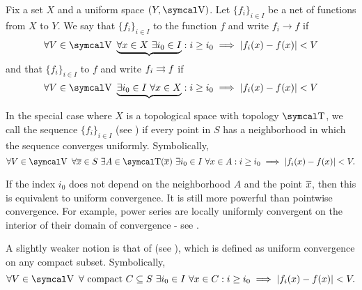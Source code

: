 \begin{definition}\label{def:function_net_convergence}
  Fix a set \( X \) and a uniform space \( (Y, \CV) \). Let \( \{ f_i \}_{i \in I} \) be a net of functions from \( X \) to \( Y \). We say that \( \{ f_i \}_{i \in I} \)  to the function \( f \) and write \( f_i \to f \) if
  \begin{equation}\label{def:function_net_convergence/pointwise}
    \forall V \in \CV \ \underbrace{\forall x \in X \ \exists i_0 \in I} : i \geq i_0 \implies \Abs{f_i(x) - f(x)} < V
  \end{equation}
  and that \( \{ f_i \}_{i \in I} \)  to \( f \) and write \( f_i \rightrightarrows f \) if
  \begin{equation}\label{def:function_net_convergence/uniform}
    \forall V \in \CV \ \underbrace{\exists i_0 \in I \ \forall x \in X} : i \geq i_0 \implies \Abs{f_i(x) - f(x)} < V
  \end{equation}

  In the special case where \( X \) is a topological space with topology \( \CT \), we call the sequence \( \{ f_i \}_{i \in I} \)  (see \cite{ProofWiki:locally_uniform_convergence}) if every point in \( S \) has a neighborhood in which the sequence converges uniformly. Symbolically,
  \begin{equation}\label{def:function_net_convergence/locally_uniform}
    \forall V \in \CV \ \forall \Ol{x} \in S \ \exists A \in \CT(\Ol{x}) \ \exists i_0 \in I \ \forall x \in A : i \geq i_0 \implies \Abs{f_i(x) - f(x)} < V.
  \end{equation}

  If the index \( i_0 \) does not depend on the neighborhood \( A \) and the point \( \overline{x} \), then this is equivalent to uniform convergence. It is still more powerful than pointwise convergence. For example, power series are locally uniformly convergent on the interior of their domain of convergence - see .

  A slightly weaker notion is that of  (see \cite{ProofWiki:compact_convergence}), which is defined as uniform convergence on any compact subset. Symbolically,
  \begin{equation}\label{def:function_net_convergence/compact}
    \forall V \in \CV \ \forall \text{ compact } C \subseteq S \ \exists i_0 \in I \ \forall x \in C : i \geq i_0 \implies \Abs{f_i(x) - f(x)} < V.
  \end{equation}
\end{definition}

